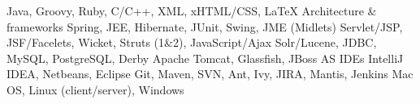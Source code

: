 
\cvcomputer
	{} {Java, Groovy, Ruby, C/C++, XML, xHTML/CSS, \LaTeX}
	{Architecture \& frameworks} {Spring, JEE, Hibernate, JUnit, Swing, JME (Midlets)}
\cvcomputer
	{} {Servlet/JSP, JSF/Facelets, Wicket, Struts (1\&2), JavaScript/Ajax}
	{} {Solr/Lucene, JDBC, MySQL, PostgreSQL, Derby}
\cvcomputer
	{} {Apache Tomcat, Glassfish, JBoss AS}
	{IDEs} {IntelliJ IDEA, Netbeans, Eclipse}
\cvcomputer
	{} {Git, Maven, SVN, Ant, Ivy, JIRA, Mantis, Jenkins}
	{} {Mac OS, Linux (client/server), Windows}
